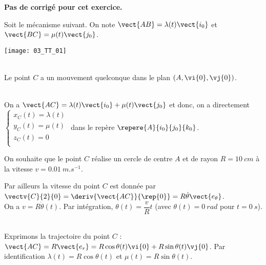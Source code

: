 \normaltrue
\correctiontrue



\setcounter{numques}{0}
\ifcorrection
\else
\textbf{Pas de corrigé pour cet exercice.}
\fi

\ifprof
\else
Soit le mécanisme suivant. On note $\vect{AB}=\lambda(t)\vect{i_0}$ et $\vect{BC}=\mu(t)\vect{j_0}$.
\begin{center}
\texttt{[image: 03\_TT\_01]}
\end{center}
\fi

\ifprof ~\\
Le point $C$ a un mouvement quelconque dans le plan $\left(A,\vi{0},\vj{0}\right)$.
\else
\fi

\ifprof ~\\
On  a $\vect{AC}=\lambda(t)\vect{i_0}+\mu(t)\vect{j_0}$ et donc, on a directement 
$\left\{
\begin{array}{l}
x_C(t)= \lambda(t) \\
y_C(t)= \mu(t)\\
z_C(t)= 0\\
\end{array}
\right.
$ dans le repère $\repere{A}{i_0}{j_0}{k_0}$.

\else
\fi

On souhaite que le point $C$ réalise un cercle de centre $A$ et de rayon $R=\SI{10}{cm}$ à la vitesse $v=\SI{0,01}{m.s^{-1}}$. 


Par ailleurs la vitesse du point $C$ est donnée par $\vectv{C}{2}{0}=\deriv{\vect{AC}}{\rep{0}} = R\dot{\theta}\vect{e_\theta}$. 
\ifprof  ~\\
On a $v=R\dot{\theta}(t)$. Par intégration, $ \theta(t)=\dfrac{v}{R}t$ (avec $\theta(t)=\SI{0}{rad}$ pour $t=\SI{0}{s}$).

\else
\fi

\ifprof  ~\\
Exprimons la trajectoire du point $C$ : $\vect{AC}=R\vect{e_r} = R\cos\theta(t) \vi{0}+ R\sin\theta(t)  \vj{0}$. Par identification 
$ \lambda(t) = R\cos\theta(t)$ et $\mu(t) = R\sin\theta(t)$.

